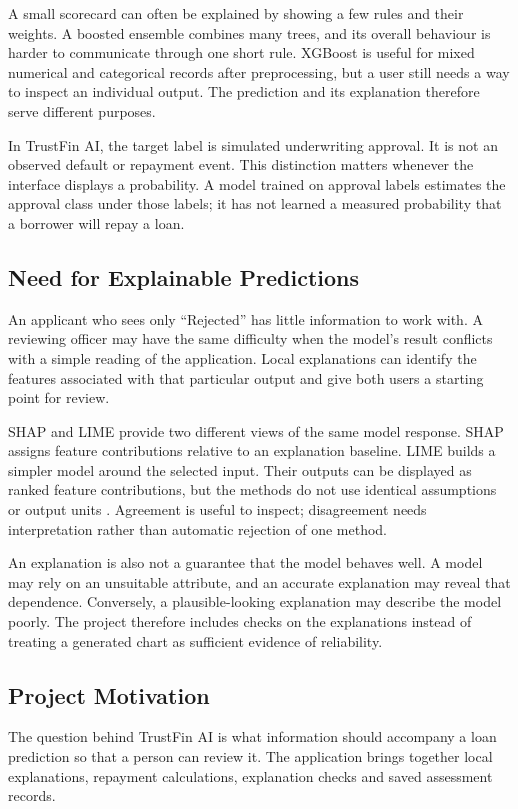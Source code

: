 A small scorecard can often be explained by showing a few rules and their weights. A boosted ensemble combines many trees, and its overall behaviour is harder to communicate through one short rule. XGBoost is useful for mixed numerical and categorical records after preprocessing, but a user still needs a way to inspect an individual output. The prediction and its explanation therefore serve different purposes.

In TrustFin AI, the target label is simulated underwriting approval. It is not an observed default or repayment event. This distinction matters whenever the interface displays a probability. A model trained on approval labels estimates the approval class under those labels; it has not learned a measured probability that a borrower will repay a loan.

\subsection{Need for Explainable Predictions}
An applicant who sees only ``Rejected'' has little information to work with. A reviewing officer may have the same difficulty when the model's result conflicts with a simple reading of the application. Local explanations can identify the features associated with that particular output and give both users a starting point for review.

SHAP and LIME provide two different views of the same model response. SHAP assigns feature contributions relative to an explanation baseline. LIME builds a simpler model around the selected input. Their outputs can be displayed as ranked feature contributions, but the methods do not use identical assumptions or output units \cite{lundberg2017,ribeiro2016}. Agreement is useful to inspect; disagreement needs interpretation rather than automatic rejection of one method.

An explanation is also not a guarantee that the model behaves well. A model may rely on an unsuitable attribute, and an accurate explanation may reveal that dependence. Conversely, a plausible-looking explanation may describe the model poorly. The project therefore includes checks on the explanations instead of treating a generated chart as sufficient evidence of reliability.

\subsection{Project Motivation}
The question behind TrustFin AI is what information should accompany a loan prediction so that a person can review it. The application brings together local explanations, repayment calculations, explanation checks and saved assessment records.

